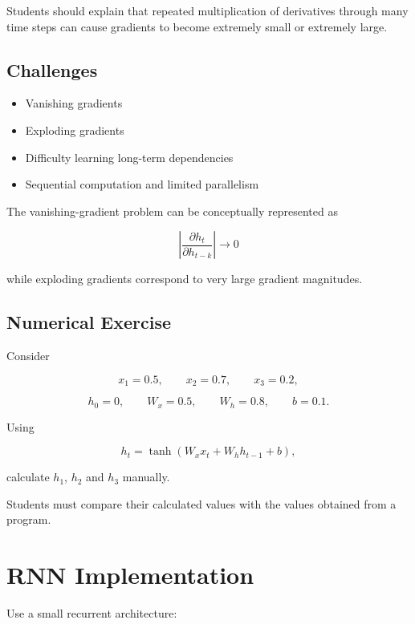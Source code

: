 \documentclass[10pt]{article}
\begin{document}
Students should explain that repeated multiplication of derivatives through
many time steps can cause gradients to become extremely small or extremely
large.

\subsection{Challenges}

\begin{itemize}
\item Vanishing gradients
\item Exploding gradients
\item Difficulty learning long-term dependencies
\item Sequential computation and limited parallelism
\end{itemize}

The vanishing-gradient problem can be conceptually represented as

\[
\left|\frac{\partial h_t}{\partial h_{t-k}}\right|\rightarrow0
\]

while exploding gradients correspond to very large gradient magnitudes.

\subsection{Numerical Exercise}

Consider

\[
x_1=0.5,\qquad x_2=0.7,\qquad x_3=0.2,
\]

\[
h_0=0,\qquad W_x=0.5,\qquad W_h=0.8,\qquad b=0.1.
\]

Using

\[
h_t=\tanh(W_xx_t+W_hh_{t-1}+b),
\]

calculate $h_1$, $h_2$ and $h_3$ manually.

Students must compare their calculated values with the values obtained from
a program.

\section{RNN Implementation}

Use a small recurrent architecture:

\begin{center}
\end{center}
\end{document}
